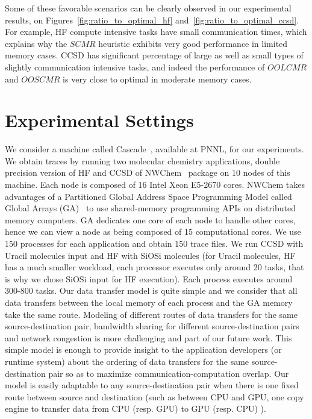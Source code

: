\documentclass[sigconf]{acmart}
\begin{document}
{		Some of these favorable scenarios can be clearly observed in our experimental results, on Figures~\ref{fig:ratio_to_optimal_hf} and~\ref{fig:ratio_to_optimal_ccsd}. For example, HF compute intensive tasks have small communication times, which explains why the $SCMR$ heuristic exhibits very good performance in limited memory cases. CCSD has significant percentage of large as well as small types of slightly communication intensive tasks, and indeed the performance of $OOLCMR$ and $OOSCMR$ is very close to optimal in moderate memory cases. 
		
		\section{Experimental Settings}
		\label{sec:expSetting}
		
		We consider a machine called Cascade~\cite{Cascade}, available at PNNL, for our experiments. We obtain traces by running two molecular chemistry applications, double precision version of  HF and CCSD of NWChem~\cite{NWChem} package on 10 nodes of this machine. Each node is composed of 16 Intel Xeon E5-2670 cores. NWChem takes advantages of a Partitioned Global Address Space Programming Model called Global Arrays (GA)~\cite{GlobalArray} to use shared-memory programming APIs on distributed memory computers. GA dedicates one core of each node to handle other cores, hence we can view a node as being composed of 15 computational cores. We use 150 processes for each application and obtain 150 trace files. We run CCSD with Uracil molecules input and HF with SiOSi molecules (for Uracil molecules, HF has a much smaller workload, each processor executes only around 20 tasks, that is why we chose SiOSi input for HF execution). Each process executes around 300-800 tasks. Our data transfer model is quite simple and we consider that all data transfers between the local memory of each process and the GA memory take the same route. Modeling of different routes of data transfers for the same source-destination pair, bandwidth sharing for different source-destination pairs and network congestion is more challenging and part of our future work. This simple model is enough to provide insight to the application developers (or runtime system) about the ordering of data transfers for the same source-destination pair so as to maximize communication-computation overlap. Our model is easily adaptable to any source-destination pair when there is one fixed route between source and destination (such as between CPU and GPU, one copy engine to transfer data from CPU (resp. GPU) to GPU (resp. CPU) ).
		
}
\end{document}
